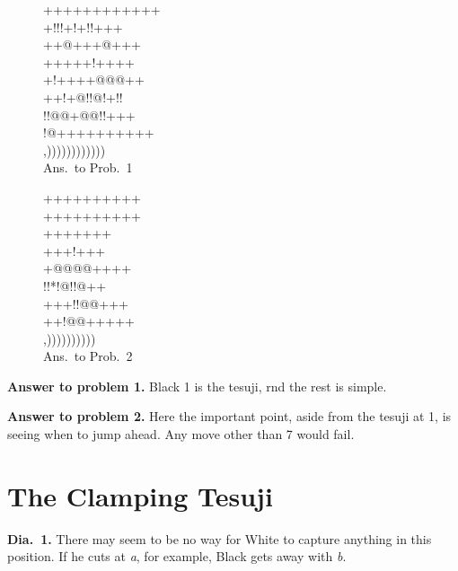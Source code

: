 \documentclass[mcrownvopaper,10pt,twopage,onecolumn,draft,showtrims]{memoir}
\begin{document}
\begin{figure}[ht]
    \begin{minipage}[c]{0.57\linewidth}
        \centering    
        {\gnos%
        ++++++++++++\\
        +!!!+!+!!+++\\
        ++@+++{\gnosb{}}@+++\\
        +++++{\gnosb{}}!{\gnosw{}}++++\\
        +!++++{\gnosw{}}@@@++\\
        ++!+@!!@!+!!\\
        !!@@+@@!!+++\\
        !@++++++++++\\
        ,))))))))))))\\
        }
        Ans.\ to Prob.\ 1
    \end{minipage}%
    \begin{minipage}[c]{0.43\linewidth}
        \centering    
        {\gnos%
        ++++++++++\\
        ++++++++++\\
        ++{\gnosb{}}+{\gnosb{}}++++\\
        +++{\gnosw{}}!{\gnosb{}}+++\\
        +@@@@{\gnosw{}}++++\\
        !!*!@!!@++\\
        +++!!@@+++\\
        ++!@@+++++\\
        ,))))))))))\\
        }
        Ans.\ to Prob.\ 2
    \end{minipage}
\end{figure}

\noindent
\textbf{Answer to problem 1.} Black 1 is the tesuji, rnd the rest is simple.

\noindent
\textbf{Answer to problem 2.} Here the important point, aside from the tesuji at
1, is seeing when to jump ahead. Any move other than 7 would fail.

\section{The Clamping Tesuji}
\textbf{Dia.\ 1.} There may seem to be no way for White to capture anything in
this position. If he cuts at \textit{a}, for example, Black gets away with \textit{b}.
\end{document}

